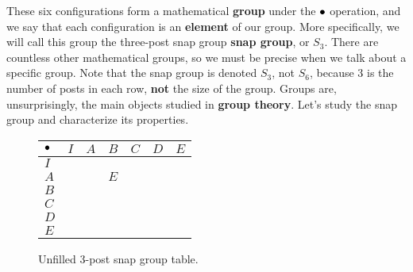 \documentclass[../gatm.tex]{subfiles}
\begin{document}
These six configurations form a mathematical \textbf{group} under the $\bullet$ operation, and we say that each configuration is an \textbf{element} of our group.
More specifically, we will call this group the three-post snap group \textbf{snap group}, or $S_3$. There are countless other mathematical groups, so we must be precise when we talk about a specific group. Note that the snap group is denoted $S_3$, not $S_6$, because $3$ is the number of posts in each row, \textbf{not} the size of the group.
Groups are, unsurprisingly, the main objects studied in \textbf{group theory}.
Let's study the snap group and characterize its properties.


\begin{figure}
	\begin{center}
		\begin{tabular}{C|C|C|C|C|C|C|}
			$\bullet$ & $I$ & $A$ & $B$ & $C$ & $D$ & $E$ \\ \hline
			$I$     &     &     &     &     &     &     \\ \hline
			$A$     &     &     & $E$ &     &     &     \\ \hline
			$B$     &     &     &     &     &     &     \\ \hline
			$C$     &     &     &     &     &     &     \\ \hline
			$D$     &     &     &     &     &     &     \\ \hline
			$E$     &     &     &     &     &     &     \\ \hline
		\end{tabular}
	\end{center}
	\caption{Unfilled $3$-post snap group table.}
	\label{fig:sbstable_CHANG}
\end{figure}
\end{document}
